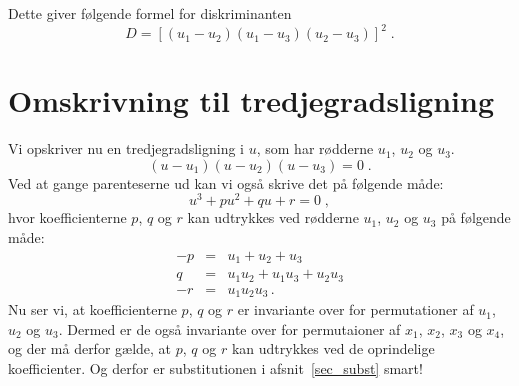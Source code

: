 \documentclass[12pt,oneside,a4paper]{article}
\newcommand{\bea}{\begin{eqnarray}}
\newcommand{\eea}{\end{eqnarray}}
\begin{document}
Dette giver følgende formel for diskriminanten
\begin{equation}
    D = \left[(u_1-u_2)(u_1-u_3)(u_2-u_3)\right]^2 \;.
    \label{eq_dis3}
\end{equation}


\section{Omskrivning til tredjegradsligning} \label{sec_omskriv}
Vi opskriver nu en tredjegradsligning i $u$, som har rødderne $u_1$, $u_2$ og 
$u_3$.
\begin{equation}
    (u-u_1)(u-u_2)(u-u_3)=0 \;.
    \label{tredje_1}
\end{equation}
Ved at gange parenteserne ud kan vi også skrive det på følgende måde:
\begin{equation}
    u^3 + pu^2+ qu + r = 0 \;,
    \label{tredje_2}
\end{equation}
hvor koefficienterne $p$, $q$ og $r$ kan udtrykkes ved rødderne $u_1$, $u_2$ og $u_3$ på følgende måde:
\bea
-p &=& u_1 + u_2 + u_3 \label{equ_p}\\
 q &=& u_1u_2 + u_1u_3 + u_2u_3 \label{equ_q}\\
-r &=& u_1u_2u_3 \label{equ_r}\,.
\eea
Nu ser vi, at koefficienterne $p$, $q$ og $r$ er invariante over for
permutationer af $u_1$, $u_2$ og $u_3$. Dermed er de også invariante over for
permutaioner af $x_1$, $x_2$, $x_3$ og $x_4$, og der må derfor gælde, at $p$,
$q$ og $r$ kan udtrykkes ved de oprindelige koefficienter. Og derfor er
substitutionen i afsnit~\ref{sec_subst} smart!
\end{document}
